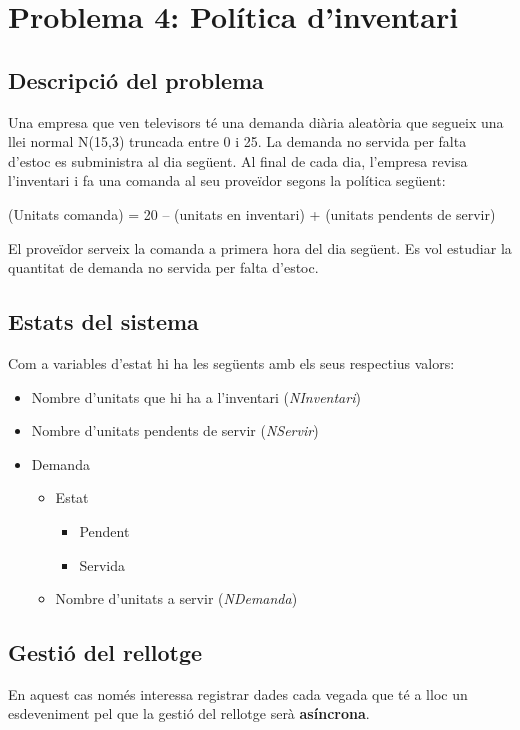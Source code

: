\documentclass[a4paper]{article}
\begin{document}
\section{Problema 4: Política d'inventari}
\subsection{Descripció del problema}
Una empresa que ven televisors té una demanda diària aleatòria que segueix una llei normal N(15,3) truncada entre 0 i 25. La demanda no servida per falta d’estoc es subministra al dia següent. Al final de cada dia, l’empresa revisa l’inventari i fa una comanda al seu proveïdor segons la política següent:

(Unitats comanda) = 20 – (unitats en inventari) + (unitats pendents de servir)

El proveïdor serveix la comanda a primera hora del dia següent.
Es vol estudiar la quantitat de demanda no servida per falta d’estoc.

\subsection{Estats del sistema}
Com a variables d'estat hi ha les següents amb els seus respectius valors:
\begin{itemize}
	\item Nombre d'unitats que hi ha a l'inventari (\emph{NInventari})
	\item Nombre d'unitats pendents de servir (\emph{NServir})
	\item Demanda
	\begin{itemize}
		\item Estat
		\begin{itemize}
			\item Pendent
			\item Servida
		\end{itemize}
		\item Nombre d'unitats a servir (\emph{NDemanda})
	\end{itemize}
\end{itemize}

\subsection{Gestió del rellotge}
En aquest cas només interessa registrar dades cada vegada que té a lloc un esdeveniment pel que la gestió del rellotge serà \textbf{asíncrona}.
\end{document}
